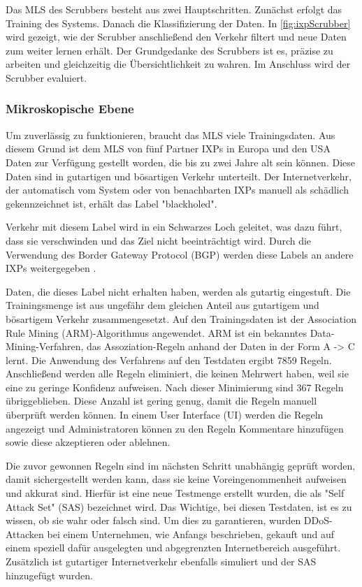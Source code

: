 \documentclass[sigplan,screen]{acmart}
\begin{document}
Das MLS des Scrubbers besteht aus zwei Hauptschritten. Zunächst erfolgt das Training des Systems. Danach die Klassifizierung der Daten. In \autoref{fig:ixpScrubber} wird gezeigt, wie der Scrubber anschließend den Verkehr filtert und neue Daten zum weiter lernen erhält.
Der Grundgedanke des Scrubbers ist es, präzise zu arbeiten und gleichzeitig die Übersichtlichkeit zu wahren. Im Anschluss wird der Scrubber evaluiert.

\subsubsection{Mikroskopische Ebene}

Um zuverlässig zu funktionieren, braucht das MLS viele Trainingsdaten. Aus diesem Grund ist dem MLS von fünf Partner IXPs in Europa und den USA Daten zur Verfügung gestellt worden, die bis zu zwei Jahre alt sein können. 
Diese Daten sind in gutartigen und bösartigen Verkehr unterteilt. Der Internetverkehr, der automatisch vom System oder von benachbarten IXPs manuell als schädlich gekennzeichnet ist, erhält das Label "blackholed". 

Verkehr mit diesem Label wird in ein Schwarzes Loch geleitet, was dazu führt, dass sie verschwinden und das Ziel nicht beeinträchtigt wird. 
Durch die Verwendung des Border Gateway Protocol (BGP) werden diese Labels an andere IXPs weitergegeben \cite{blackhole01}.

Daten, die dieses Label nicht erhalten haben, werden als gutartig eingestuft. Die Trainingsmenge ist aus ungefähr dem gleichen Anteil aus gutartigem und bösartigem Verkehr zusammengesetzt.
Auf den Trainingsdaten ist der Association Rule Mining (ARM)-Algorithmus angewendet. ARM ist ein bekanntes Data-Mining-Verfahren, das Assoziation-Regeln anhand der Daten in der Form A -> C lernt. Die Anwendung des Verfahrens auf den Testdaten ergibt 7859 Regeln. Anschließend werden alle Regeln eliminiert, die keinen Mehrwert haben, weil sie eine zu geringe Konfidenz aufweisen. Nach dieser Minimierung sind 367 Regeln übriggeblieben. Diese Anzahl ist gering genug, damit die Regeln manuell überprüft werden können. In einem User Interface (UI) werden die Regeln angezeigt und Administratoren können zu den Regeln Kommentare hinzufügen sowie diese akzeptieren oder ablehnen.

Die zuvor gewonnen Regeln sind im nächsten Schritt unabhängig geprüft worden, damit sichergestellt werden kann, dass sie keine Voreingenommenheit aufweisen und akkurat sind. Hierfür ist eine neue Testmenge erstellt wurden, die als "Self Attack Set" (SAS) bezeichnet wird. Das Wichtige, bei diesen Testdaten, ist es zu wissen, ob sie wahr oder falsch sind. Um dies zu garantieren, wurden DDoS-Attacken bei einem Unternehmen, wie Anfangs beschrieben, gekauft und auf einem speziell dafür ausgelegten und abgegrenzten Internetbereich ausgeführt. Zusätzlich ist gutartiger Internetverkehr ebenfalls simuliert und der SAS hinzugefügt wurden.
\end{document}
